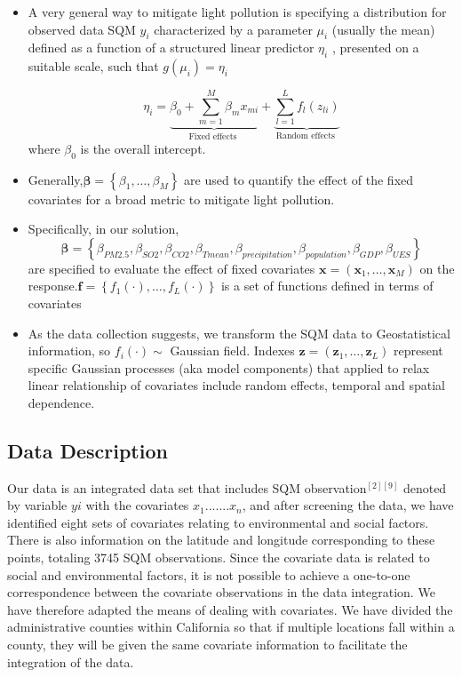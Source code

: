 \documentclass{mcmthesis}
\begin{document}
\begin{itemize}

\item A very general way to mitigate light pollution is specifying a distribution for observed data SQM $y_{i}$  characterized by a parameter  $\mu_{i}$  (usually the mean) defined as a function of a structured linear predictor  $\eta_{i}$ , presented on a suitable scale, such that  $g\left(\mu_{i}\right)=\eta_{i}$


$$
\eta_{i}=\underbrace{\beta_{0}+\sum_{m=1}^{M} \beta_{m} x_{m i}}_{\text {Fixed effects }}+\underbrace{\sum_{l=1}^{L} f_{l}\left(z_{l i}\right)}_{\text {Random effects }}
$$where $\beta_{0}$  is the overall intercept.\\

\item Generally,$\boldsymbol{\beta}=\left\{\beta_{1}, \ldots, \beta_{M}\right\}$ are used to quantify the effect of the fixed covariates for a broad metric to mitigate light pollution.\\

\item Specifically, in our solution, $$\boldsymbol\beta = \left\{\beta_{PM2.5}, \beta_{SO2},\beta_{CO2},\beta_{Tmean},\beta_{precipitation},
\beta_{population},\beta_{GDP},\beta_{UES}\right\} $$ are specified to evaluate the effect of fixed covariates  $\boldsymbol{x}=\left(\boldsymbol{x}_{1}, \ldots, \boldsymbol{x}_{M}\right)$  on the response.$\boldsymbol{f}=\left\{f_{1}(\cdot), \ldots, f_{L}(\cdot)\right\}$  is a set of functions defined in terms of covariates\\


\item As the data collection suggests, we transform the SQM data to Geostatistical information, so  $f_{i}(\cdot)\sim $ Gaussian field.          Indexes  $\boldsymbol{z}=\left(\boldsymbol{z}_{1}, \ldots, \boldsymbol{z}_{L}\right)$ represent specific Gaussian processes (aka model components) that applied to relax linear relationship of covariates include random effects, temporal and spatial dependence.\\

\end{itemize}


\subsection{Data Description}
Our data is an integrated data set that includes SQM observation$^{[2][9]}$ denoted by variable $yi$ with the covariates $x_{1} ...... .x_{n}$, and after screening the data, we have identified eight sets of covariates relating to environmental and social factors. There is also information on the latitude and longitude corresponding to these points, totaling 3745 SQM observations. Since the covariate data is related to social and environmental factors, it is not possible to achieve a one-to-one correspondence between the covariate observations in the data integration. We have therefore adapted the means of dealing with covariates. We have divided the administrative counties within California so that if multiple locations fall within a county, they will be given the same covariate information to facilitate the integration of the data.
\end{document}
